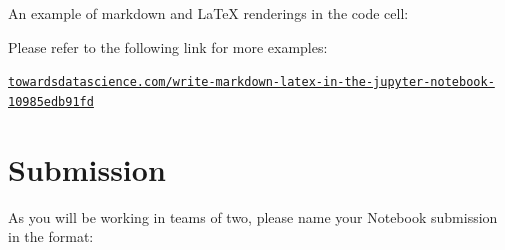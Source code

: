 \documentclass[a4paper,10pt]{article}
\begin{document}
\begin{figure}[H]
    \centering
    \hspace{1em}
\end{figure}

An example of markdown and LaTeX renderings in the code cell:

\begin{center}
\end{center}

Please refer to the following link for more examples:

\small \href{https://towardsdatascience.com/write-markdown-latex-in-the-jupyter-notebook-10985edb91fd}{\nolinkurl{towardsdatascience.com/write-markdown-latex-in-the-jupyter-notebook-10985edb91fd}}

\section{Submission}
As you will be working in teams of two, please name your Notebook submission in the format:

\begin{center}
\end{center}
\end{document}
